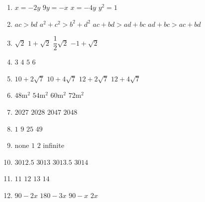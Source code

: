 \documentclass[10pt,paper=letter]{scrartcl}
\begin{document}
\begin{enumerate}
\item \fourch
{$x=-2y$}
{$9y=-x$}
{$x=-4y$}
{$y^2=1$}

\item \fourch
{$ac>bd$}
{$a^2+c^2>b^2+d^2$}
{$ac+bd>ad+bc$}
{$ad+bc>ac+bd$}

\item \fourch
{$\sqrt{2}$}
{$1+\sqrt{2}$}
{$\dfrac{1}{2}\sqrt{2}$}
{$-1+\sqrt{2}$}

\item \fourch
{$3$}
{$4$}
{$5$}
{$6$}

\item \fourch
{$10+2\sqrt{7}$}
{$10+4\sqrt{7}$}
{$12+2\sqrt{7}$}
{$12+4\sqrt{7}$}

\item \fourch
{$48 \text{m}^2$}
{$54 \text{m}^2$}
{$60 \text{m}^2$}
{$72 \text{m}^2$}

\item \fourch
{$2027$}
{$2028$}
{$2047$}
{$2048$}

\item \fourch
{$1$}
{$9$}
{$25$}
{$49$}

\item \fourch
{none}
{$1$}
{$2$}
{infinite}

\item \fourch
{$3012.5$}
{$3013$}
{$3013.5$}
{$3014$}

\item \fourch
{$11$}
{$12$}
{$13$}
{$14$}

\item \fourch
{$90-2x$}
{$180-3x$}
{$90-x$}
{$2x$}
\end{enumerate}
\end{document}
